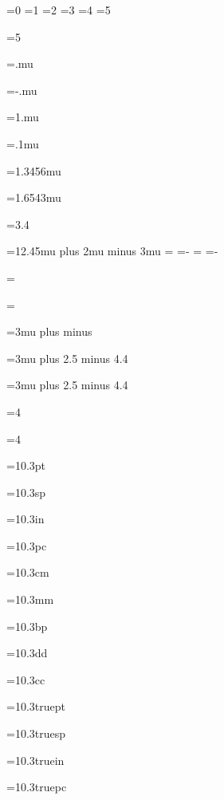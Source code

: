 =0
=1
=2
=3
=4
=5

=5
\showthe{}

=.mu
\showthe{}

=-.mu
\showthe{}

=1.mu
\showthe{}

=.1mu
\showthe{}

=1.3456mu
\showthe{}

=1.6543mu
\showthe{}

=3.4
\showthe{}

=12.45mu plus 2mu minus 3mu
\showthe{}
=
\showthe{}
=-
\showthe{}
=
\showthe{}
=-
\showthe{}

=
\showthe{}

=
\showthe{}

=3mu plus  minus 
\showthe{}

=3mu plus 2.5 minus 4.4
\showthe{}

=3mu plus 2.5 minus 4.4
\showthe{}

=4
\showthe{}

=4
\showthe{}

=10.3pt
\showthe{}

=10.3sp
\showthe{}

=10.3in
\showthe{}

=10.3pc
\showthe{}

=10.3cm
\showthe{}

=10.3mm
\showthe{}

=10.3bp
\showthe{}

=10.3dd
\showthe{}

=10.3cc
\showthe{}


=10.3truept
\showthe{}

=10.3truesp
\showthe{}

=10.3truein
\showthe{}

=10.3truepc
\showthe{}

